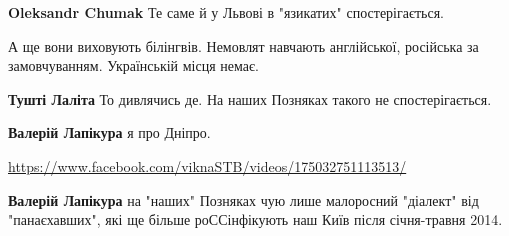 \begin{itemize}
\begin{itemize}
 
\textbf{Oleksandr Chumak} Те саме й у Львові в "язикатих" спостерігається.
\end{itemize}

 
А ще вони виховують білінгвів. Немовлят навчають англійської, російська за
замовчуванням. Українській місця немає.

\begin{itemize}
 
\textbf{Тушті Лаліта} То дивлячись де. На наших Позняках такого не спостерігається.

 
\textbf{Валерій Лапікура} я про Дніпро.

 
\url{https://www.facebook.com/viknaSTB/videos/175032751113513/}

 
\textbf{Валерій Лапікура} на "наших" Позняках чую лише малоросний "діалект" від
"панаєхавших", які ще більше роССінфікують наш Київ після січня-травня 2014.
\end{itemize}


\end{itemize}
